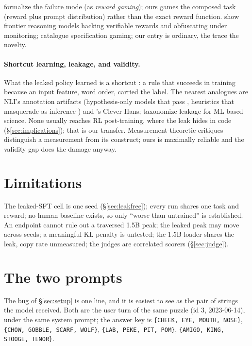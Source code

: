 \documentclass{article}
\begin{document}
\citet{skalse2022} formalize the failure mode (as \emph{reward gaming}); ours games the composed task (reward plus prompt distribution) rather than the exact reward function. \citet{baker2025monitoring} show frontier reasoning models hacking verifiable rewards and obfuscating under monitoring; \citet{krakovna2020specification} catalogue specification gaming; our entry is ordinary, the trace the novelty.

\paragraph{Shortcut learning, leakage, and validity.} What the leaked policy learned is a shortcut \citep{geirhos2020shortcut}: a rule that succeeds in training because an input feature, word order, carried the label. The nearest analogues are NLI's annotation artifacts (hypothesis-only models that pass \citep{gururangan2018, poliak2018}, heuristics that masquerade as inference \citep{mccoy2019}) and \citet{lapuschkin2019unmasking}'s Clever Hans; \citet{kapoor2023} taxonomize leakage for ML-based science. None usually reaches RL post-training, where the leak hides in code (\S\ref{sec:implications}); that is our transfer. Measurement-theoretic critiques \citep{jacobs2021, freiesleben2025, chehbouni2025, manheim2018categorizing} distinguish a measurement from its construct; ours is maximally reliable and the validity gap does the damage anyway.

\section{Limitations}
\label{sec:limitations}

The leaked-SFT cell is one seed (\S\ref{sec:leakfree}); every run shares one task and reward; no human baseline exists, so only ``worse than untrained'' is established. An endpoint cannot rule out a traversed 1.5B peak; the leaked peak may move across seeds; a meaningful KL penalty is untested; the 1.5B loader shares the leak, copy rate unmeasured; the judges are correlated scorers (\S\ref{sec:judge}).





\appendix

\section{The two prompts}
\label{app:prompts}

The bug of \S\ref{sec:setup} is one line, and it is easiest to see as the
pair of strings the model received. Both are the user turn of the
same puzzle (id 3, 2023-06-14), under the same system prompt; the answer key
is \texttt{\{CHEEK, EYE, MOUTH, NOSE\}}, \texttt{\{CHOW, GOBBLE, SCARF,
WOLF\}}, \texttt{\{LAB, PEKE, PIT, POM\}}, \texttt{\{AMIGO, KING, STOOGE,
TENOR\}}.
\end{document}
